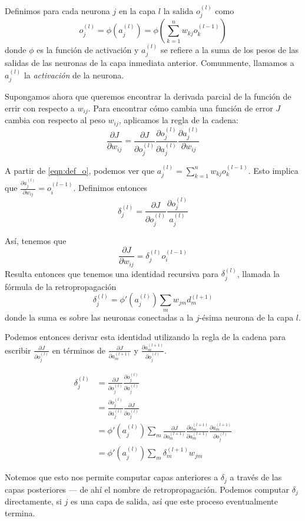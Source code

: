 Definimos para cada neurona $j$ en la capa $l$ la salida $o^{(l)}_j$ como
\begin{equation}
\label{eqn:def_o}
  o^{(l)}_j = \phi(a^{(l)}_j) = \phi(\sum_{k=1}^n w_{kj}o_k^{(l-1)})
\end{equation}
donde $\phi$ es la función de activación y $a_j^{(l)}$ se refiere a la
suma de los pesos de las salidas de las neuronas de la capa inmediata
anterior. Comunmente, llamamos a $a_j^{(l)}$ la \textit{activación} de
la neurona.

Supongamos ahora que queremos encontrar la derivada parcial de la
función de errir con respecto a $w_{ij}$.
Para encontrar cómo cambia una función de error $J$ cambia con respecto
al peso $w_{ij}$, aplicamos la regla de la cadena:
\begin{equation}
  \frac{\partial J}{\partial w_{ij}} = \frac{\partial J}{\partial o_j^{(l)}}
  \frac{\partial o_j^{(l)}}{\partial a_j^{(l)}} \frac{\partial a_j^{(l)}}{\partial w_{ij}}
\end{equation}

A partir de \ref{eqn:def_o}, podemos ver que
$a_j^{(l)} = \sum_{k=1}^n w_{kj}o_k^{(l-1)}$. Esto implica que
$\frac{\partial a_j^{(l)}}{\partial w_{ij}} = o_i^{(l-1)}$. Definimos entonces
\begin{equation}
  \delta_j^{(l)} = \frac{\partial J}{\partial o_j^{(l)}} \frac{\partial o_j^{(l)}}{a_j^{(l)}}
\end{equation}

Así, tenemos que
\begin{equation}
  \frac{\partial J}{\partial w_{ij}} = \delta_j^{(l)}o_i^{(l-1)}
\end{equation}
Resulta entonces que tenemos una identidad recursiva para
$\delta_j^{(l)}$, llamada la fórmula de la retropropagación
\begin{equation}
  \delta_j^{(l)} = \phi'(a_j^{(l)})\sum_m w_{jm} d_m^{(l+1)}
\end{equation}
donde la suma es sobre las neuronas conectadas a la $j$-ésima neurona
de la capa $l$.

Podemos entonces derivar esta identidad utilizando la regla de la cadena
para escribir $\frac{\partial J}{\partial o_j^{(l)}}$ en términos de
$\frac{\partial J}{\partial a_m^{(l+1)}}$ y $\frac{\partial a_m^{(l+1)}}{\partial o_j^{(l)}}$.

\begin{equation}
\begin{split}
  \delta_j^{(l)} &= \frac{\partial J}{\partial o_j^{(l)}} \frac{\partial o_j^{(l)}}{\partial a_j^{(l)}} \\
  &= \frac{\partial o_j^{(l)}}{\partial a_j^{(l)}} \frac{\partial J}{\partial o_j^{(l)}} \\
  &= \phi' (a_j^{(l)}) \sum_m \frac{\partial J}{\partial o_m^{(l+1)}} \frac{\partial o_m^{(l+1)}}{\partial a_m^{(l+1)}} \frac{\partial a_m^{(l+1)}}{\partial o_j^{(l)}} \\
  &= \phi'(a_j^{(l)}) \sum_m \delta_m^{(l+1)}w_{jm}
\end{split}
\end{equation}

Notemos que esto nos permite computar capas anteriores a $\delta_j$ a
través de las capas posteriores --- de ahí el nombre de retropropagación.
Podemos computar $\delta_j$ directamente, si $j$ es una capa de salida,
así que este proceso eventualmente termina.
